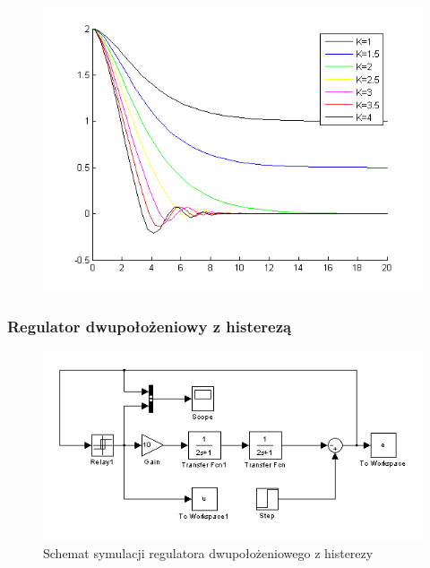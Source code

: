 \documentclass[a4paper,10pt]{article}
\begin{document}
\begin{figure}[!h]
    \centering
	\includegraphics[width=120mm]{CW3-wykres-2bez.png}
	\caption{}
    \label{fig:Rysunek}
\end{figure}

\subsubsection{Regulator dwupołożeniowy z histerezą}\label{sec:r2h}
\begin{figure}[h]
    \centering
	\includegraphics[width=120mm]{CW3-schemat-2z.png}
	\caption{Schemat symulacji regulatora dwupołożeniowego z histerezy}
    \label{fig:Rysunek}
\end{figure}
\end{document}
